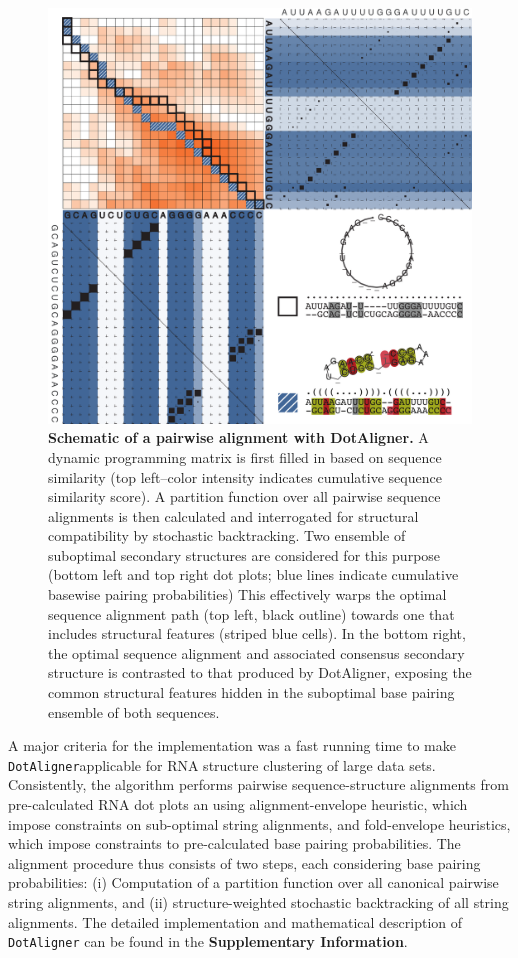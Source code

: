 \documentclass[a4paper,11pt]{article}
\newcommand\dotaligner{\texttt{DotAligner}}
\begin{document}
\begin{figure}
 \includegraphics[width=\textwidth]{fig1}
\caption { \textbf{Schematic of a pairwise alignment with DotAligner. }
  A dynamic  programming matrix is first filled in based on sequence 
  similarity (top left--color intensity indicates cumulative sequence similarity score). 
  A partition function over all pairwise sequence alignments is then calculated and 
  interrogated for structural compatibility by stochastic backtracking. 
  Two ensemble of suboptimal secondary structures are considered for this purpose
  (bottom left and top right dot plots; blue lines indicate cumulative basewise pairing probabilities)      This effectively warps the optimal  sequence alignment path (top left, black outline) towards one that includes structural features (striped blue cells).  In the bottom right, the optimal sequence alignment 
  and associated consensus secondary structure is contrasted to that produced 
  by DotAligner, exposing the common structural features hidden in the suboptimal 
  base pairing ensemble of both sequences. 
 }
\end{figure}

A major criteria for the implementation was a fast running time to make 
\dotaligner applicable for RNA structure clustering of large data sets.
Consistently, the algorithm performs pairwise sequence-structure alignments from 
pre-calculated RNA dot plots an using alignment-envelope heuristic, which 
impose constraints on sub-optimal string alignments, and fold-envelope 
heuristics, which impose constraints to pre-calculated base pairing probabilities.
The alignment procedure thus consists of two steps, each considering base pairing  
probabilities: (i) Computation of a partition function over all canonical pairwise 
string alignments, and (ii) structure-weighted stochastic backtracking of 
all string alignments. The detailed implementation and mathematical description 
of \dotaligner{} can be found  in the \textbf{Supplementary Information}.\\
\end{document}
